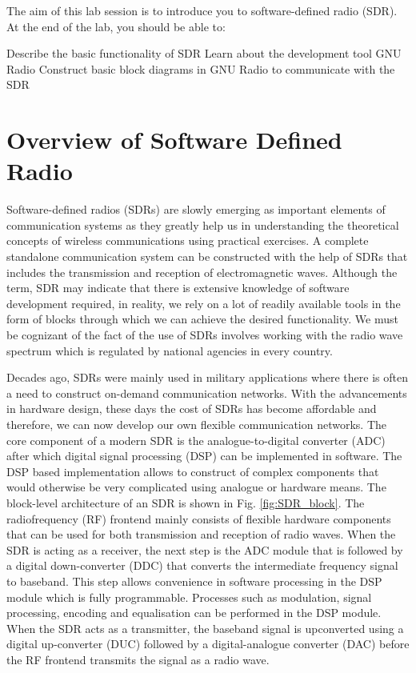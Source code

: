 \documentclass[11pt]{article}
\begin{document}
The aim of this lab session is to introduce you to software-defined radio (SDR). At the end of the lab, you should be able to:
\begin{outline}
  \1 Describe the basic functionality of SDR
  \1 Learn about the development tool GNU Radio
  \1 Construct basic block diagrams in GNU Radio to communicate with the SDR
\end{outline}


\section{Overview of Software Defined Radio}

Software-defined radios (SDRs) are slowly emerging as important elements of communication systems as they greatly help us in understanding the theoretical concepts of wireless communications using practical exercises. A complete standalone communication system can be constructed with the help of SDRs that includes the transmission and reception of electromagnetic waves. Although the term, SDR may indicate that there is extensive knowledge of software development required, in reality, we rely on a lot of readily available tools in the form of blocks through which we can achieve the desired functionality. We must be cognizant of the fact of the use of SDRs involves working with the radio wave spectrum which is regulated by national agencies in every country. 

Decades ago, SDRs were mainly used in military applications where there is often a need to construct on-demand communication networks. With the advancements in hardware design, these days the cost of SDRs has become affordable and therefore, we can now develop our own flexible communication networks. The core component of a modern SDR is the analogue-to-digital converter (ADC) after which digital signal processing (DSP) can be implemented in software. The DSP based implementation allows to construct of complex components that would otherwise be very complicated using analogue or hardware means. The block-level architecture of an SDR is shown in Fig. \ref{fig:SDR_block}. The radiofrequency (RF) frontend mainly consists of flexible hardware components that can be used for both transmission and reception of radio waves. When the SDR is acting as a receiver, the next step is the ADC module that is followed by a digital down-converter (DDC) that converts the intermediate frequency signal to baseband. This step allows convenience in software processing in the DSP module which is fully programmable. Processes such as modulation, signal processing, encoding and equalisation can be performed in the DSP module. When the SDR acts as a transmitter, the baseband signal is upconverted using a digital up-converter (DUC) followed by a digital-analogue converter (DAC) before the RF frontend transmits the signal as a radio wave.
\end{document}

